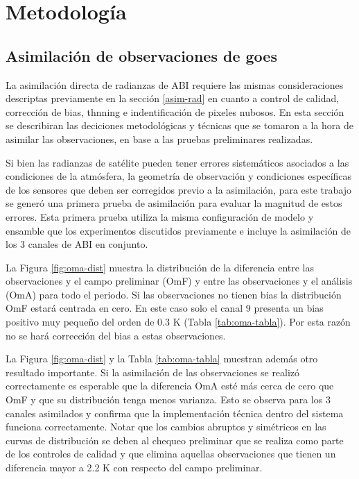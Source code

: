 \documentclass[12pt,oneside]{reedthesis}
\begin{document}
\hypertarget{metodologuxeda-2}{%
\section{Metodología}\label{metodologuxeda-2}}

\hypertarget{asim-goes}{%
\subsection{Asimilación de observaciones de goes}\label{asim-goes}}

La asimilación directa de radianzas de ABI requiere las mismas consideraciones descriptas previamente en la sección \ref{asim-rad} en cuanto a control de calidad, corrección de bias, thnning e indentificación de pixeles nubosos. En esta sección se describiran las deciciones metodológicas y técnicas que se tomaron a la hora de asimilar las observaciones, en base a las pruebas preliminares realizadas.

Si bien las radianzas de satélite pueden tener errores sistemáticos asociados a las condiciones de la atmósfera, la geometría de observación y condiciones específicas de los sensores que deben ser corregidos previo a la asimilación, para este trabajo se generó una primera prueba de asimilación para evaluar la magnitud de estos errores. Esta primera prueba utiliza la misma configuración de modelo y ensamble que los experimentos discutidos previamente e incluye la asimilación de los 3 canales de ABI en conjunto.

La Figura \ref{fig:oma-dist} muestra la distribución de la diferencia entre las observaciones y el campo preliminar (OmF) y entre las observaciones y el análisis (OmA) para todo el periodo. Si las observaciones no tienen bias la distribución OmF estará centrada en cero. En este caso solo el canal 9 presenta un bias positivo muy pequeño del orden de 0.3 K (Tabla \ref{tab:oma-tabla}). Por esta razón no se hará corrección del bias a estas observaciones.

La Figura \ref{fig:oma-dist} y la Tabla \ref{tab:oma-tabla} muestran además otro resultado importante. Si la asimilación de las observaciones se realizó correctamente es esperable que la diferencia OmA esté más cerca de cero que OmF y que su distribución tenga menos varianza. Esto se observa para los 3 canales asimilados y confirma que la implementación técnica dentro del sistema funciona correctamente. Notar que los cambios abruptos y simétricos en las curvas de distribución se deben al chequeo preliminar que se realiza como parte de los controles de calidad y que elimina aquellas observaciones que tienen un diferencia mayor a 2.2 K con respecto del campo preliminar.
\end{document}
